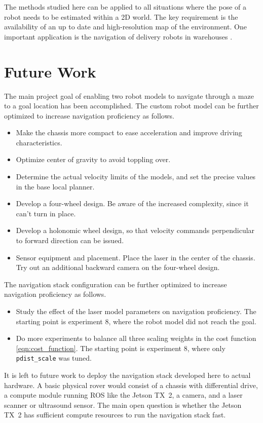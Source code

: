 \documentclass[10pt,journal,compsoc]{IEEEtran}
\begin{document}
The methods studied here can be applied to all situations where the pose of a robot needs to be estimated within a 2D world. The key requirement is the availability of an up to date and high-resolution map of the environment. One important application is the navigation of delivery robots in warehouses \cite{warehousing}.

\section{Future Work}
\label{sec:future_work}
The main project goal of enabling two robot models to navigate through a maze to a goal location has been accomplished. The custom robot model can be further optimized to increase navigation proficiency as follows.
\begin{itemize}
\item Make the chassis more compact to ease acceleration and improve driving characteristics. 
\item Optimize center of gravity to avoid toppling over.
\item Determine the actual velocity limits of the models, and set the precise values in the base local planner.
\item Develop a four-wheel design. Be aware of the increased complexity, since it can't turn in place.
\item Develop a holonomic wheel design, so that velocity commands perpendicular to forward direction can be issued.
\item Sensor equipment and placement. Place the laser in the center of the chassis. Try out an additional backward camera on the four-wheel design.
\end{itemize}
The navigation stack configuration can be further optimized to increase navigation proficiency as follows.
\begin{itemize}
\item Study the effect of the laser model parameters on navigation proficiency. The starting point is experiment 8, where the robot model did not reach the goal.
\item Do more experiments to balance all three scaling weights in the cost function \ref{eqn:cost_function}. The starting point is experiment 8, where only \texttt{pdist\_scale} was tuned.
\end{itemize}

It is left to future work to deploy the navigation stack developed here to actual hardware. A basic physical rover would consist of a chassis with differential drive, a compute module running ROS like the Jetson TX\ 2, a camera, and a laser scanner or ultrasound sensor. The main open question is whether the Jetson TX\ 2 has sufficient compute resources to run the navigation stack fast.
\end{document}
